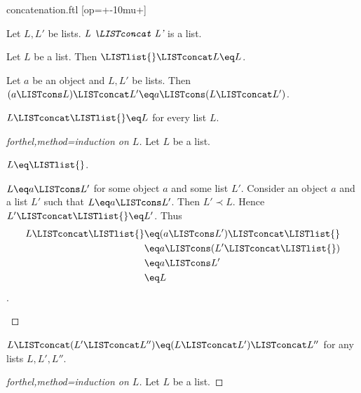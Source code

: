 \documentclass{naproche-library}
\begin{document}
\begin{smodule}[title=Concatenation]{concatenation.ftl}
[op=+\mkern-10mu+]{\mathbin{\highlight{+\mkern-10mu+}}}

\begin{signature}[forthel,id=LISTS_CONCAT_4578620297183232]
  Let $L, L'$ be lists.
  $\emph{L \LISTconcat L'}$ is a list.
\end{signature}

\begin{axiom}[forthel,id=LISTS_CONCAT_3703161885818880]
  Let $L$ be a list.
  Then $\LISTlist{} \LISTconcat L \eq L$.
\end{axiom}

\begin{axiom}[forthel,id=LISTS_CONCAT_8050301789536256]
  Let $a$ be an object and $L, L'$ be lists.
  Then $(a \LISTcons L) \LISTconcat L' \eq a \LISTcons (L \LISTconcat L')$.
\end{axiom}

\begin{proposition}[forthel,id=LISTS_CONCAT_4512036658964875]
  $L \LISTconcat \LISTlist{} \eq L$ for every list $L$.
\end{proposition}
\begin{proof}[forthel,method=induction on $L$]
  Let $L$ be a list.

  \begin{case}{$L \eq \LISTlist{}$.} \end{case}
  
  \begin{case}{$L \eq a \LISTcons L'$ for some object $a$ and some list $L'$.}
    Consider an object $a$ and a list $L'$ such that $L \eq a \LISTcons L'$.
    Then $L' \prec L$.
    Hence $L' \LISTconcat \LISTlist{} \eq L'$.
    Thus
    \begin{align*}
      L \LISTconcat \LISTlist{}
        &\eq (a \LISTcons L') \LISTconcat \LISTlist{}\\
        &\eq a \LISTcons (L' \LISTconcat \LISTlist{})\\
        &\eq a \LISTcons L'\\
        &\eq L
    \end{align*}.
  \end{case}
\end{proof}

\begin{proposition}[forthel,id=LISTS_CONCAT_1021563255448756]
  $L \LISTconcat (L' \LISTconcat L'') \eq (L \LISTconcat L') \LISTconcat L''$ for any lists $L, L', L''$.
\end{proposition}
\begin{proof}[forthel,method=induction on $L$]
  Let $L$ be a list.


\end{proof}
\end{smodule}
\end{document}
